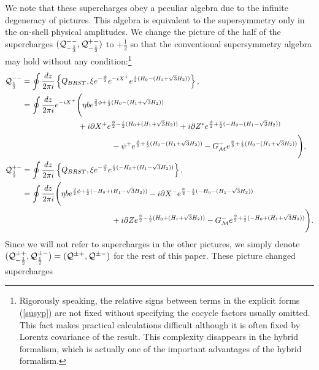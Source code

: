 \documentclass[a4paper,seceq,preprint]{ptptex}
\newcommand{\dz}{\frac{dz}{2\pi i}}
\begin{document}
We note that these supercharges obey a peculiar algebra
due to the infinite degeneracy of pictures. This algebra is 
equivalent to the supersymmetry only in the on-shell physical 
amplitudes. We change the picture of the half of the 
supercharges 
$({\cal Q}^{--}_{-\frac{1}{2}},{\cal Q}^{+-}_{-\frac{1}{2}})$ to 
$+\frac{1}{2}$ so that the conventional supersymmetry algebra
may hold without any condition:\footnote{
Rigorously speaking, the relative signs between terms in the explicit 
forms (\ref{susyp}) are not fixed without specifying the cocycle factors 
usually omitted. This fact makes practical calculations difficult
although it is often fixed by Lorentz covariance of the result. This
complexity disappears in the hybrid formalism, which is
actually one of the important advantages of the hybrid formalism.}
\begin{align}
 {\cal Q}^{--}_{\frac{1}{2}}&=\oint\dz\left\{Q_{BRST},\xi
e^{-\frac{\phi}{2}}e^{-iX^+}e^{\frac{i}{2}(H_0-(H_1+\sqrt{3}H_2))}\right\},
\nonumber\\
&=\oint\dz e^{-iX^+}\Bigg(
\eta be^{\frac{3}{2}\phi+\frac{i}{2}(H_0-(H_1+\sqrt{3}H_2))}
\nonumber\\
&\hspace{2.5cm}
+i\partial X^+e^{\frac{\phi}{2}-\frac{i}{2}(H_0+(H_1+\sqrt{3}H_2))}
+i\partial Z^*e^{\frac{\phi}{2}+\frac{i}{2}(-H_0-(H_1-\sqrt{3}H_2))}
\nonumber\\
&\hspace{4cm}
-\psi^+e^{\frac{\phi}{2}+\frac{i}{2}(H_0-(H_1+\sqrt{3}H_2))}
-G^-_{\cal M}e^{\frac{\phi}{2}+\frac{i}{2}(H_0-(H_1+\sqrt{3}H_2))}
\Bigg),\nonumber\\
 {\cal Q}^{+-}_{\frac{1}{2}}&=\oint\dz\left\{Q_{BRST},\xi 
e^{-\frac{\phi}{2}}e^{\frac{i}{2}(-H_0+(H_1-\sqrt{3}H_2))}\right\},
\nonumber\\
&=\oint\dz\Bigg(
\eta be^{\frac{3}{2}\phi+\frac{i}{2}(-H_0+(H_1-\sqrt{3}H_2))}
-i\partial X^-e^{\frac{\phi}{2}-\frac{i}{2}(-H_0-(H_1-\sqrt{3}H_2))}
\nonumber\\
&\hspace{4cm}
+i\partial Ze^{\frac{\phi}{2}-\frac{i}{2}(H_0+(H_1+\sqrt{3}H_2))}
-G^-_{\cal M}e^{\frac{\phi}{2}+\frac{i}{2}(-H_0+(H_1+\sqrt{3}H_2))}
\Bigg).\label{susyp}
\end{align}
Since we will not refer to supercharges in the other pictures,
we simply denote $({\cal Q}^{\pm+}_{-\frac{1}{2}},
{\cal Q}^{\pm-}_{\frac{1}{2}})=({\cal Q}^{\pm+},{\cal Q}^{\pm-})$ 
for the rest of this paper. These picture changed supercharges
\end{document}

